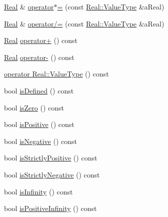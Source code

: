 \begin{DoxyCompactItemize}
\item 
\hyperlink{classlibrary_1_1core_1_1types_1_1_real}{Real} \& \hyperlink{classlibrary_1_1core_1_1types_1_1_real_ae0bdf12b023e5eafaf18e62c7459ccda}{operator$\ast$=} (const \hyperlink{classlibrary_1_1core_1_1types_1_1_real_a9c5c8826b7e5a8e39544d23fea6c0e1c}{Real\+::\+Value\+Type} \&a\+Real)
\item 
\hyperlink{classlibrary_1_1core_1_1types_1_1_real}{Real} \& \hyperlink{classlibrary_1_1core_1_1types_1_1_real_a6a9a6530460f746c7e7fdbba3b6932fe}{operator/=} (const \hyperlink{classlibrary_1_1core_1_1types_1_1_real_a9c5c8826b7e5a8e39544d23fea6c0e1c}{Real\+::\+Value\+Type} \&a\+Real)
\item 
\hyperlink{classlibrary_1_1core_1_1types_1_1_real}{Real} \hyperlink{classlibrary_1_1core_1_1types_1_1_real_a7f39b72df1d66f354dce558a99dc2da5}{operator+} () const
\item 
\hyperlink{classlibrary_1_1core_1_1types_1_1_real}{Real} \hyperlink{classlibrary_1_1core_1_1types_1_1_real_a7a018943c5110e4023f5e462eed70a25}{operator-\/} () const
\item 
\hyperlink{classlibrary_1_1core_1_1types_1_1_real_a04a25244977883708efaa427e411703b}{operator Real\+::\+Value\+Type} () const
\item 
bool \hyperlink{classlibrary_1_1core_1_1types_1_1_real_a424f4e213c63db76b879c294b9126e37}{is\+Defined} () const
\item 
bool \hyperlink{classlibrary_1_1core_1_1types_1_1_real_a7f9a08009b4d5033ff8c9eaa4a6b2c7e}{is\+Zero} () const
\item 
bool \hyperlink{classlibrary_1_1core_1_1types_1_1_real_af2ace2b52781a5e537daef7e6cee6df3}{is\+Positive} () const
\item 
bool \hyperlink{classlibrary_1_1core_1_1types_1_1_real_aa12d6c4d50c80dc184e34d6e52c9dd10}{is\+Negative} () const
\item 
bool \hyperlink{classlibrary_1_1core_1_1types_1_1_real_ac96efb831bb08fd5cfe0f8cfc18ee6b1}{is\+Strictly\+Positive} () const
\item 
bool \hyperlink{classlibrary_1_1core_1_1types_1_1_real_a91029945199886cd83279f29cc225b91}{is\+Strictly\+Negative} () const
\item 
bool \hyperlink{classlibrary_1_1core_1_1types_1_1_real_a4603222d9315aa59355778d66c0b214d}{is\+Infinity} () const
\item 
bool \hyperlink{classlibrary_1_1core_1_1types_1_1_real_a432e5a765554e8656e9bcb6d54f1553d}{is\+Positive\+Infinity} () const
\item 

\end{DoxyCompactItemize}
